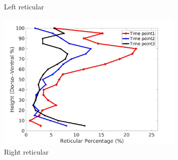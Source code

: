 \begin{figure}[H]
\begin{subfigure}{.42\linewidth}
  \caption{Left reticular}
  \label{fig:IPF5DiseaseDorsoToVentral-c} 
\end{subfigure} 
\begin{subfigure}{.42\linewidth}%
  \includegraphics[width=\linewidth,trim={{.0\wd0} {.0\wd0} {.0\wd0} {.0\wd0}},clip]{Appendix/Image_AppexA/DorsoToVentral/IPF5RightLungReticularDiseaseDorsoToVentral.jpg}
  \caption{Right reticular}
  \label{fig:IPF5DiseaseDorsoToVentral-d}
\end{subfigure}
\begin{subfigure}{.42\linewidth}%

\end{subfigure}
\end{figure}
